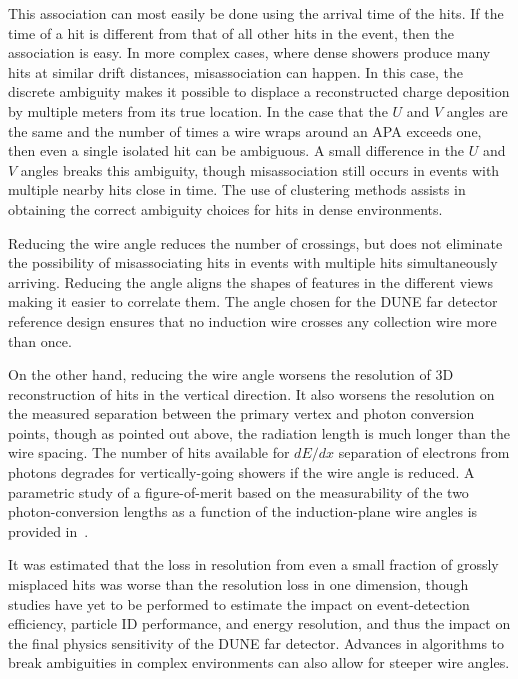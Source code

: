 This association can most easily be done using the arrival time of the
hits.  If the time of a hit is different from that of all other hits
in the event, then the association is easy.  In more complex cases,
where dense showers produce many hits at similar drift distances,
misassociation can happen.  In this case, the discrete ambiguity makes
it possible to displace a reconstructed charge deposition by multiple
meters from its true location.  In the case that the $U$ and $V$
angles are the same and the number of times a wire wraps around an APA
exceeds one, then even a single isolated hit can be ambiguous.  A
small difference in the $U$ and $V$ angles breaks this ambiguity,
though misassociation still occurs in events with multiple nearby hits
close in time.  The use of clustering methods assists in obtaining the
correct ambiguity choices for hits in dense environments.

Reducing the wire angle reduces the number of crossings, but does not
eliminate the possibility of misassociating hits in events with
multiple hits simultaneously arriving.  
Reducing the angle aligns the
shapes of features in the different views making it easier to
correlate them.
The angle chosen for the DUNE far detector
reference design ensures that no induction wire crosses any collection
wire more than once.

On the other hand, reducing the wire angle worsens the resolution of
3D reconstruction of hits in the vertical direction. 
It also worsens the resolution on the measured separation between the
primary vertex and photon conversion points, though as pointed out
above, the radiation length is much longer than the wire spacing.  
The number of hits available for $dE/dx$ separation of electrons from
photons degrades for vertically-going showers if the wire angle is
reduced.  A parametric study of a figure-of-merit based on the
measurability of the two photon-conversion lengths as a function of
the induction-plane wire angles is provided
in~\cite{wire-orientation}.

It was estimated that the loss in resolution from even a small fraction
of grossly misplaced hits %
was worse than the resolution loss in one
dimension\cite{docdb-8981}, though studies have yet to be performed
to estimate the impact on event-detection efficiency,
particle ID performance, and energy resolution, and thus the impact on the
final physics sensitivity of the DUNE far detector.  
Advances in algorithms to break ambiguities in complex environments can also allow
for steeper wire angles.

